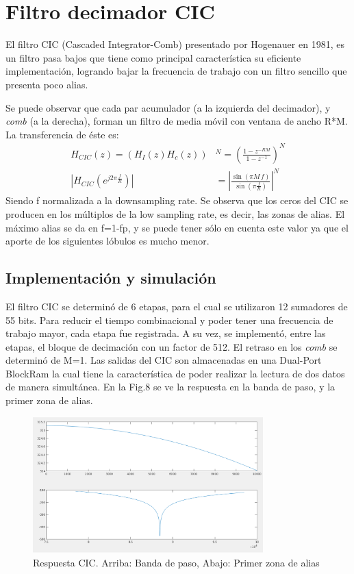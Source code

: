 \documentclass[a4paper,conference]{IEEEtran}
\begin{document}
\section{Filtro decimador CIC}
El filtro CIC (Cascaded Integrator-Comb) presentado por Hogenauer en 1981,  es un filtro pasa bajos que tiene como principal caracter\'istica su eficiente implementaci\'on, logrando bajar la frecuencia de trabajo con un filtro sencillo que presenta poco alias.

Se puede observar que cada par acumulador (a la izquierda del decimador), y \textit{comb} (a la derecha), forman un filtro de media m\'ovil con ventana de ancho R*M. La transferencia de \'este es:
\begin{align}
H_{CIC}(z)= \left( H_I(z) H_c(z)\right)& ^{N}=\left( \frac{1-z^{-RM}}{1-z^{-1}}\right) ^N\\
\left| H_{CIC}(e^{j2\pi\frac{f}{R}})\right| &=\left| \frac{\sin(\pi M\,f)}{\sin(\pi \frac{f}{R})}\right| ^{N}
\end{align}
Siendo f normalizada a la downsampling rate.
Se observa que los ceros del CIC se producen en los m\'ultiplos de la low sampling rate, es decir, las zonas de alias. El m\'aximo alias se da en f=1-fp, y se puede tener s\'olo en cuenta este valor ya que el aporte de los siguientes l\'obulos es mucho menor.

\subsection{Implementaci\'on y simulaci\'on}
El filtro CIC se determin\'o de 6 etapas, para el cual se utilizaron 12 sumadores de 55 bits. Para reducir el tiempo combinacional y poder tener una frecuencia de trabajo mayor, cada etapa fue registrada. A su vez, se implement\'o, entre las etapas, el bloque de decimaci\'on con un factor de 512. El retraso en los \textit{comb} se determin\'o de M=1.  Las salidas del CIC son almacenadas en una Dual-Port BlockRam la cual tiene la caracter\'istica de poder realizar la lectura de dos datos de manera simultánea. En la Fig.8 se ve la respuesta en la banda de paso, y la primer zona de alias.

\begin{figure}[!t]
\centering
\includegraphics[width=3.5in]{Respuesta_CIC}
\caption{Respuesta CIC. Arriba: Banda de paso, Abajo: Primer zona de alias}
\label{fig_8}
\end{figure}
\end{document}
